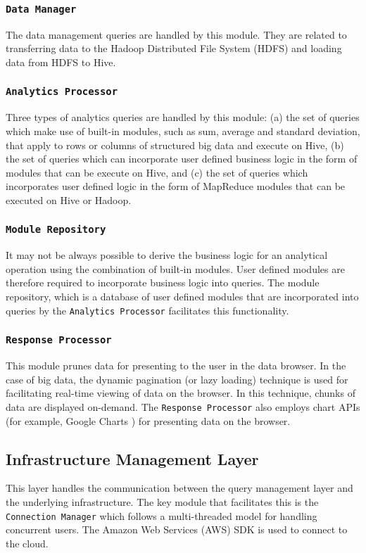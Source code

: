 \documentclass[10pt, conference, compsocconf]{IEEEtran}
\begin{document}
\subsubsection{\normalfont \texttt{Data Manager}}
The data management queries are handled by this module. They are related to transferring data to the Hadoop Distributed File System (HDFS) \cite{hdfs-1} and loading data from HDFS to Hive. 

\subsubsection{\normalfont \texttt{Analytics Processor}}
Three types of analytics queries are handled by this module: (a) the set of queries which make use of built-in modules, such as sum, average and standard deviation, that apply to rows or columns of structured big data and execute on Hive, (b) the set of queries which can incorporate user defined business logic in the form of modules that can be execute on Hive, and (c) the set of queries which incorporates user defined logic in the form of MapReduce \cite{mapreduce-1} modules that can be executed on Hive or Hadoop. 

\subsubsection{\normalfont \texttt{Module Repository}}
It may not be always possible to derive the business logic for an analytical operation using the combination of built-in modules. User defined modules are therefore required to incorporate business logic into queries. The module repository, which is a database of user defined modules that are incorporated into queries by the \texttt{Analytics Processor} facilitates this functionality.

\subsubsection{\normalfont \texttt{Response Processor}}
This module prunes data for presenting to the user in the data browser. In the case of big data, the dynamic pagination (or lazy loading) technique is used for facilitating real-time viewing of data on the browser. In this technique, chunks of data are displayed on-demand. The \texttt{Response Processor} also employs chart APIs (for example, Google Charts \cite{googlecharts}) for presenting data on the browser.  

\subsection{Infrastructure Management Layer}
This layer handles the communication between the query management layer and the underlying infrastructure. The key module that facilitates this is the \texttt{Connection Manager} which follows a multi-threaded model for handling concurrent users. The Amazon Web Services (AWS) SDK \cite{awssdk} is used to connect to the cloud. 
\end{document}
